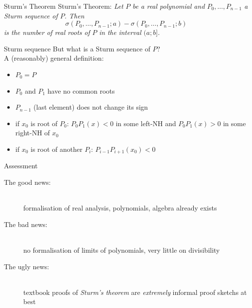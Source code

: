 \documentclass[%
	sans,			%
	mathsans,		%
	10pt,
	t		%
	slidescentered,%
]{beamer}
\begin{document}
\begin{frame}{Sturm's Theorem}
Sturm's Theorem: \textit{Let $P$ be a real polynomial and $P_0, \ldots, P_{n-1}$ a Sturm sequence of $P$. Then
$$\sigma(P_0, \ldots, P_{n-1}; a) - \sigma(P_0, \ldots, P_{n-1}; b)$$
is the number of real roots of $P$ in the interval $(a; b]$.}
\end{frame}

\begin{frame}{Sturm sequence}
But what is a Sturm sequence of $P$?\\
A (reasonably) general definition:\\
\begin{itemize}
\item $P_0 = P$
\item $P_0$ and $P_1$ have no common roots
\item $P_{n-1}$ (last element) does not change its sign
\item if $x_0$ is root of $P_0$: $P_0P_1(x)<0$ in some left-NH and $P_0P_1(x)>0$ in some right-NH of $x_0$
\item if $x_0$ is root of another $P_i$: $P_{i-1}P_{i+1}(x_0) < 0$
\end{itemize}
\end{frame}

\begin{frame}{Assessment}
\begin{description}
\item[The good news:]\ \\formalisation of real analysis, polynomials, algebra already exists
\pause\item[The bad news:]\ \\no formalisation of limits of polynomials, very little on divisibility
\pause\item[The ugly news:]\ \\textbook proofs of \emph{Sturm's theorem} are \emph{extremely} informal proof sketchs at best
\end{description}
\end{frame}
\end{document}
